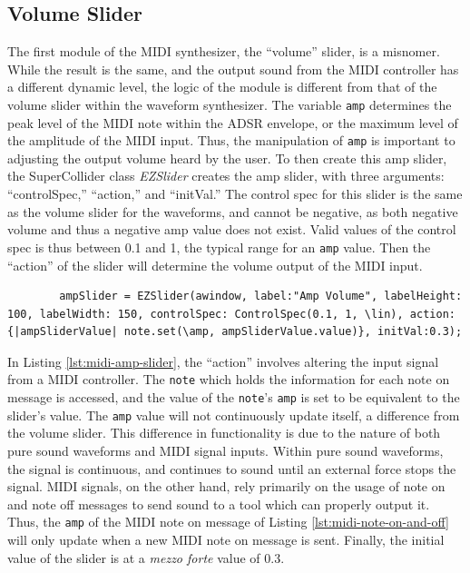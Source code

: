 \subsection{Volume Slider}

The first module of the MIDI synthesizer, the ``volume'' slider, is a misnomer. While the result is the same, and the output sound from the MIDI controller has a different dynamic level, the logic of the module is different from that of the volume slider within the waveform synthesizer. The variable \texttt{amp} determines the peak level of the MIDI note within the ADSR envelope, or the maximum level of the amplitude of the MIDI input. Thus, the manipulation of \texttt{amp} is important to adjusting the output volume heard by the user. To then create this amp slider, the SuperCollider class \textit{EZSlider} creates the amp slider, with three arguments: ``controlSpec,'' ``action,'' and ``initVal.'' The control spec for this slider is the same as the volume slider for the waveforms, and cannot be negative, as both negative volume and thus a negative amp value does not exist. Valid values of the control spec is thus between 0.1 and 1, the typical range for an \texttt{amp} value. Then the ``action'' of the slider will determine the volume output of the MIDI input. 

\begin{listing}
	\begin{lstlisting}
		ampSlider = EZSlider(awindow, label:"Amp Volume", labelHeight: 100, labelWidth: 150, controlSpec: ControlSpec(0.1, 1, \lin), action:{|ampSliderValue| note.set(\amp, ampSliderValue.value)}, initVal:0.3);
	\end{lstlisting}	
	\caption{Creating the amp slider for MIDI}
	\label{lst:midi-amp-slider}
\end{listing}

In Listing \ref{lst:midi-amp-slider}, the ``action'' involves altering the input signal from a MIDI controller. The \texttt{note} which holds the information for each note on message is accessed, and the value of the \texttt{note}'s \texttt{amp} is set to be equivalent to the slider's value. The \texttt{amp} value will not continuously update itself, a difference from the volume slider. This difference in functionality is due to the nature of both pure sound waveforms and MIDI signal inputs. Within pure sound waveforms, the signal is continuous, and continues to sound until an external force stops the signal. MIDI signals, on the other hand, rely primarily on the usage of note on and note off messages to send sound to a tool which can properly output it. Thus, the \texttt{amp} of the MIDI note on message of Listing \ref{lst:midi-note-on-and-off} will only update when a new MIDI note on message is sent. Finally, the initial value of the slider is at a \textit{mezzo forte} value of 0.3.

